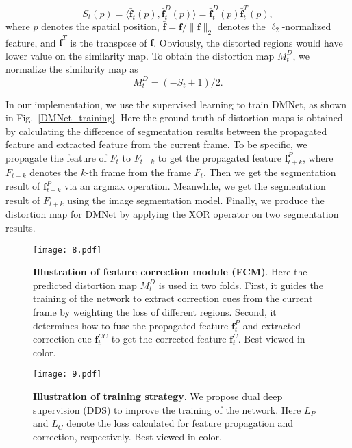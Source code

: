 \documentclass[journal]{IEEEtran}
\begin{document}
\begin{equation}
S_{t}(p)=\langle\bar{\mathbf{f}}_{t}(p), \bar{\mathbf{f}}^{D}_{t}(p)\rangle=\bar{\mathbf{f}}^{D}_{t}(p) \bar{\mathbf{f}}^{T}_{t}(p),
\end{equation}
where $p$ denotes the spatial position, $\bar{\mathbf{f}}=\mathbf{f}/\|\mathbf{f}\|_{2}$ denotes the $\ell_{2}$-normalized feature, and $\bar{\mathbf{f}}^{T}$ is the transpose of $\bar{\mathbf{f}}$. Obviously, the distorted regions would have lower value on the similarity map. To obtain the distortion map $M^D_{t}$, we normalize the similarity map as 
\begin{equation}
M^D_{t}=(-S_{t}+1)/2.
\end{equation}


In our implementation, we use the supervised learning to train DMNet, as shown in Fig.~\ref{DMNet_training}. Here the ground truth of distortion maps is obtained by calculating the difference of segmentation results between the propagated feature and extracted feature from the current frame. To be specific, we propagate the feature of $F_{t}$ to $F_{t+k}$ to get the propagated feature $\mathbf{f}^{P}_{t+k}$, where $F_{t+k}$ denotes the $k$-th frame from the frame $F_{t}$. Then we get the segmentation result of $\mathbf{f}^{P}_{t+k}$ via an argmax operation. Meanwhile, we get the segmentation result of $F_{t+k}$ using the image segmentation model. 
Finally, we produce the distortion map  for DMNet by applying the XOR operator on two segmentation results.


\begin{figure}[t]
	\begin{center}
		\texttt{[image: 8.pdf]}
	\end{center}
	\caption{\textbf{Illustration of feature correction module (FCM)}. Here the predicted distortion map $M^{D}_{t}$ is used in two folds. First, it guides the training of the network to extract correction cues from the current frame by weighting the loss of different regions. Second, it determines how to fuse the propagated feature $\mathbf{f}^{P}_{t}$  and extracted correction cue $\mathbf{f}^{CC}_{t}$ to get the corrected feature $\mathbf{f}^{C}_{t}$. Best viewed in color.}
	\label{FCM}
\end{figure}


\begin{figure}[t]
	\begin{center}
		\texttt{[image: 9.pdf]}
	\end{center}
	\caption{\textbf{Illustration of training strategy}. We propose dual deep supervision (DDS) to improve the training of the network. Here $L_{P}$ and $L_{C}$ denote the loss calculated for feature propagation and correction, respectively. Best viewed in color.}
	\label{framework_training}
\end{figure}
\end{document}
